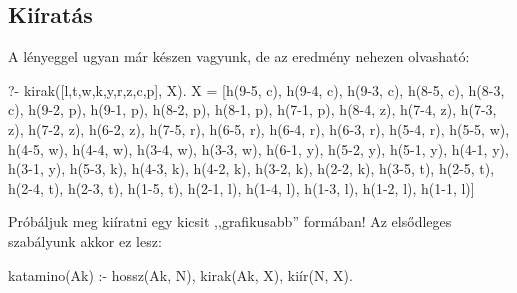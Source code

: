 \subsection*{Kiíratás}
A lényeggel ugyan már készen vagyunk, de az eredmény
nehezen olvasható:
\begin{query}
?- kirak([l,t,w,k,y,r,z,c,p], X).
  X = [h(9-5, c), h(9-4, c), h(9-3, c), h(8-5, c),
       h(8-3, c), h(9-2, p), h(9-1, p), h(8-2, p),
       h(8-1, p), h(7-1, p), h(8-4, z), h(7-4, z),
       h(7-3, z), h(7-2, z), h(6-2, z), h(7-5, r),
       h(6-5, r), h(6-4, r), h(6-3, r), h(5-4, r),
       h(5-5, w), h(4-5, w), h(4-4, w), h(3-4, w),
       h(3-3, w), h(6-1, y), h(5-2, y), h(5-1, y),
       h(4-1, y), h(3-1, y), h(5-3, k), h(4-3, k),
       h(4-2, k), h(3-2, k), h(2-2, k), h(3-5, t),
       h(2-5, t), h(2-4, t), h(2-3, t), h(1-5, t), 
       h(2-1, l), h(1-4, l), h(1-3, l), h(1-2, l),
       h(1-1, l)]
\end{query}

Próbáljuk meg kiíratni egy kicsit ,,grafikusabb''
formában! Az elsődleges szabályunk akkor ez lesz:
\begin{program}
katamino(Ak) :-
    hossz(Ak, N), kirak(Ak, X), kiír(N, X).
\end{program}

